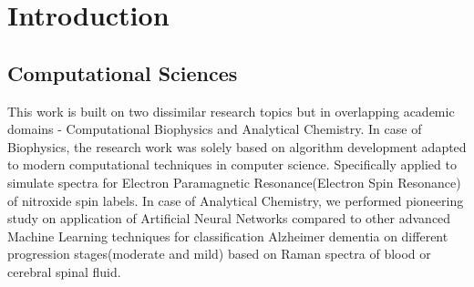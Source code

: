 \chapter{Introduction}
\section{Computational Sciences}
This work is built on two dissimilar research topics but in overlapping academic domains - Computational Biophysics and Analytical Chemistry. In case of Biophysics, the research work was solely based on algorithm development adapted to modern computational techniques in computer science. Specifically applied to simulate spectra for Electron Paramagnetic Resonance(Electron Spin Resonance) of nitroxide spin labels. In case of Analytical Chemistry, we performed pioneering study on application of Artificial Neural Networks compared to other advanced Machine Learning techniques for classification Alzheimer dementia on different progression stages(moderate and mild) based on Raman spectra of blood or cerebral spinal fluid.
